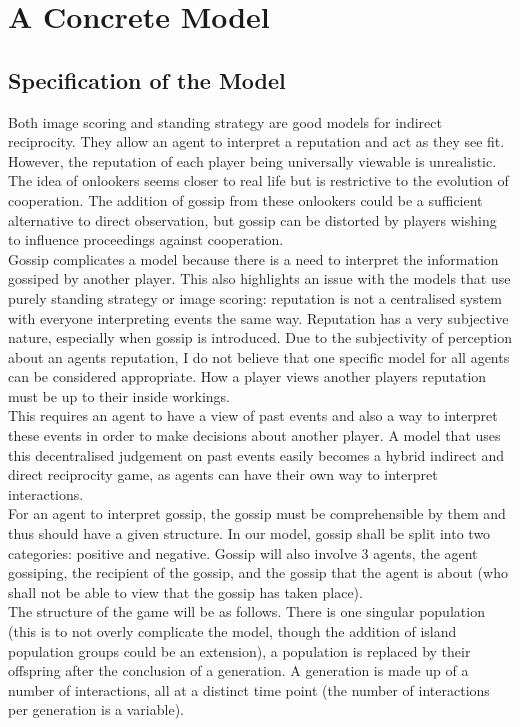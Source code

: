 \documentclass[twoside,twocolumn]{article}
\begin{document}

\section{A Concrete Model}
\subsection{Specification of the Model}
Both image scoring and standing strategy are good models for indirect reciprocity. They allow an agent to interpret a reputation and act as they see fit. However, the reputation of each player being universally viewable is unrealistic. The idea of onlookers seems closer to real life but is restrictive to the evolution of cooperation. The addition of gossip from these onlookers could be a sufficient alternative to direct observation, but gossip can be distorted by players wishing to influence proceedings against cooperation.\\
Gossip complicates a model because there is a need to interpret the information gossiped by another player. This also highlights an issue with the models that use purely standing strategy or image scoring: reputation is not a centralised system with everyone interpreting events the same way. Reputation has a very subjective nature, especially when gossip is introduced. Due to the subjectivity of perception about an agents reputation, I do not believe that one specific model for all agents can be considered appropriate. How a player views another players reputation must be up to their inside workings.\\
This requires an agent to have a view of past events and also a way to interpret these events in order to make decisions about another player. A model that uses this decentralised judgement on past events easily becomes a hybrid indirect and direct reciprocity game, as agents can have their own way to interpret interactions.\\
For an agent to interpret gossip, the gossip must be comprehensible by them and thus should have a given structure. In our model, gossip shall be split into two categories: positive and negative. Gossip will also involve 3 agents, the agent gossiping, the recipient of the gossip, and the gossip that the agent is about (who shall not be able to view that the gossip has taken place).\\
The structure of the game will be as follows. There is one singular population (this is to not overly complicate the model, though the addition of island population groups could be an extension), a population is replaced by their offspring after the conclusion of a generation. A generation is made up of a number of interactions, all at a distinct time point (the number of interactions per generation is a variable).\\
\end{document}
